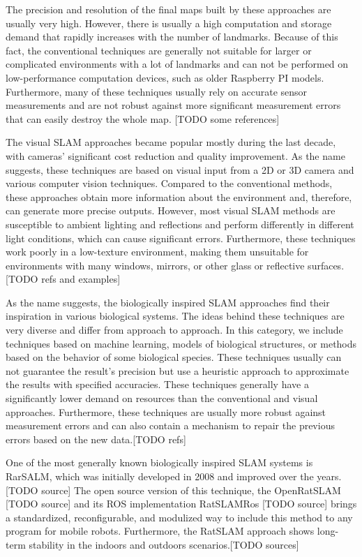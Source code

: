 The precision and resolution of the final maps built by these approaches are usually very high. However, there is usually a high computation and storage demand that rapidly increases with the number of landmarks. Because of this fact, the conventional techniques are generally not suitable for larger or complicated environments with a lot of landmarks and can not be performed on low-performance computation devices, such as older Raspberry PI models. Furthermore, many of these techniques usually rely on accurate sensor measurements and are not robust against more significant measurement errors that can easily destroy the whole map. [TODO some references]\par
The visual SLAM approaches became popular mostly during the last decade, with cameras' significant cost reduction and quality improvement. As the name suggests, these techniques are based on visual input from a 2D or 3D camera and various computer vision techniques. Compared to the conventional methods, these approaches obtain more information about the environment and, therefore, can generate more precise outputs. However, most visual SLAM methods are susceptible to ambient lighting and reflections and perform differently in different light conditions, which can cause significant errors. Furthermore, these techniques work poorly in a low-texture environment, making them unsuitable for environments with many windows, mirrors, or other glass or reflective surfaces.[TODO refs and examples]\par
As the name suggests, the biologically inspired SLAM approaches find their inspiration in various biological systems. The ideas behind these techniques are very diverse and differ from approach to approach. In this category, we include techniques based on machine learning, models of biological structures, or methods based on the behavior of some biological species. These techniques usually can not guarantee the result's precision but use a heuristic approach to approximate the results with specified accuracies. These techniques generally have a significantly lower demand on resources than the conventional and visual approaches. Furthermore, these techniques are usually more robust against measurement errors and can also contain a mechanism to repair the previous errors based on the new data.[TODO refs]\par
One of the most generally known biologically inspired SLAM systems is RarSALM, which was initially developed in 2008 and improved over the years. [TODO source] The open source version of this technique, the OpenRatSLAM [TODO source] and its ROS implementation RatSLAMRos [TODO source] brings a standardized, reconfigurable, and modulized way to include this method to any program for mobile robots. Furthermore, the RatSLAM approach shows long-term stability in the indoors and outdoors scenarios.[TODO sources]\par
